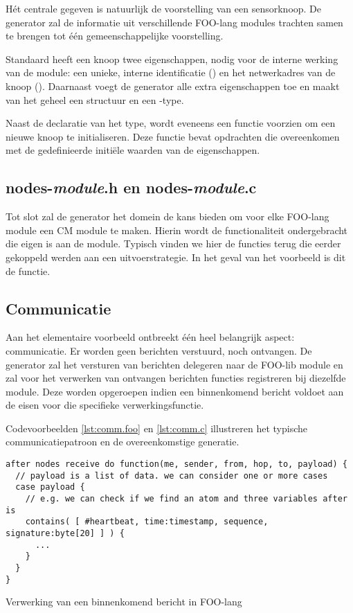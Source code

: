 H\'et centrale gegeven is natuurlijk de voorstelling van een sensorknoop. De
generator zal de informatie uit verschillende FOO-lang modules trachten samen
te brengen tot \'e\'en gemeenschappelijke voorstelling.

Standaard heeft een knoop twee eigenschappen, nodig voor de interne werking van
de  module: een unieke, interne identificatie () en het
netwerkadres van de knoop (). Daarnaast voegt de generator alle
extra eigenschappen toe en maakt van het geheel een structuur en een
-type.

Naast de declaratie van het type, wordt eveneens een functie voorzien om een
nieuwe knoop te initialiseren. Deze functie bevat opdrachten die overeenkomen
met de gedefinieerde initi\"ele waarden van de eigenschappen.

\subsection{nodes-\emph{module}.h en nodes-\emph{module}.c}

Tot slot zal de generator het  domein de kans bieden om voor elke
FOO-lang module een CM module te maken. Hierin wordt de functionaliteit
ondergebracht die eigen is aan de module. Typisch vinden we hier de functies
terug die eerder gekoppeld werden aan een uitvoerstrategie. In het geval van
het voorbeeld is dit de  functie.

\subsection{Communicatie}

Aan het elementaire voorbeeld ontbreekt \'e\'en heel belangrijk aspect:
communicatie. Er worden geen berichten verstuurd, noch ontvangen. De generator
zal het versturen van berichten delegeren naar de  FOO-lib module en
zal voor het verwerken van ontvangen berichten functies registreren bij
diezelfde module. Deze worden opgeroepen indien een binnenkomend bericht
voldoet aan de eisen voor die specifieke verwerkingsfunctie.

Codevoorbeelden \ref{lst:comm.foo} en \ref{lst:comm.c} illustreren het typische
communicatiepatroon en de overeenkomstige generatie.

\begin{listing}[ht]
  \begin{verbatim}
after nodes receive do function(me, sender, from, hop, to, payload) {
  // payload is a list of data. we can consider one or more cases
  case payload {
    // e.g. we can check if we find an atom and three variables after is
    contains( [ #heartbeat, time:timestamp, sequence, signature:byte[20] ] ) {
      ...
    }
  }
}
  \end{verbatim}
  \vspace{-5mm}
  \caption{Verwerking van een binnenkomend bericht in FOO-lang}
  \label{lst:comm.foo}
\end{listing}

